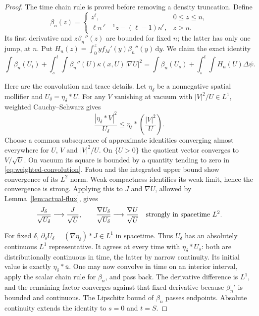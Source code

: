 \documentclass[11pt]{article}
\numberwithin{equation}{section}
\theoremstyle{definition}
\theoremstyle{remark}
\newcommand{\dd}{\,\mathrm d}
\begin{document}
\begin{proof}
The time chain rule is proved before removing a density truncation. Define
\[
 \beta_n(z)=\begin{cases}
 z^\ell,&0\le z\le n,\\
 \ell n^{\ell-1}z-(\ell-1)n^\ell,&z>n.
 \end{cases}
\]
Its first derivative and $z\beta_n''(z)$ are bounded for fixed $n$;
the latter has only one jump, at $n$. Put
$H_n(z)=\int_0^z y f_M'(y)\beta_n''(y)\dd y$.
We claim the exact identity
\begin{equation}\label{eq:truncated-chain}
 \int\beta_n(U_t)+\int_s^t\!\int\beta_n''(U)\kappa(x,U)|\nabla U|^2
 =\int\beta_n(U_s)+\int_s^t\!\int H_n(U)\Delta\psi.
\end{equation}

Here are the convolution and trace details. Let $\eta_\delta$ be a
nonnegative spatial mollifier and $U_\delta=\eta_\delta*U$.
For any $V$ vanishing at vacuum with $|V|^2/U\in L^1$, weighted
Cauchy--Schwarz gives
\begin{equation}\label{eq:weighted-convolution}
 \frac{|\eta_\delta*V|^2}{U_\delta}
          \le\eta_\delta*\left(\frac{|V|^2}{U}\right).
\end{equation}
Choose a common subsequence of approximate identities converging almost
everywhere for $U$, $V$ and $|V|^2/U$. On $\{U>0\}$ the quotient vector converges
to $V/\sqrt U$. On vacuum its square is bounded by a quantity tending
to zero in \eqref{eq:weighted-convolution}. Fatou and the integrated upper
bound show convergence of its $L^2$ norm. Weak compactness identifies its
weak limit, hence the convergence is strong. Applying this to $J$ and
$\nabla U$, allowed by Lemma~\ref{lem:actual-flux}, gives
\begin{equation}\label{eq:weighted-strong}
 \frac{J_\delta}{\sqrt{U_\delta}}\longrightarrow\frac J{\sqrt U},
 \qquad
 \frac{\nabla U_\delta}{\sqrt{U_\delta}}
                \longrightarrow\frac{\nabla U}{\sqrt U}
 \quad\hbox{strongly in spacetime }L^2.
\end{equation}

For fixed $\delta$,
$\partial_s U_\delta=(\nabla\eta_\delta)*J\in L^1$ in spacetime.
Thus $U_\delta$ has an absolutely continuous $L^1$ representative.
It agrees at every time with $\eta_\delta*U_s$: both are distributionally
continuous in time, the latter by narrow continuity. Its initial value is
exactly $\eta_\delta*\bar u$.
One may now convolve in time on an interior interval, apply the scalar
chain rule for $\beta_n$, and pass back. The derivative difference is
$L^1$, and the remaining factor converges against that fixed derivative
because $\beta_n'$ is bounded and continuous. The Lipschitz bound of
$\beta_n$ passes endpoints. Absolute continuity extends the identity to
$s=0$ and $t=S$.


\end{proof}
\end{document}
